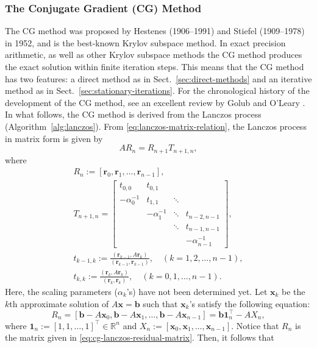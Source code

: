 \subsubsection{{The Conjugate Gradient (CG) Method}}\label{subsec:conjugate-gradient}
{The CG method  was proposed by Hestenes (1906--1991) and Stiefel (1909--1978) in 1952, and is the best-known Krylov subspace method. In exact precision arithmetic, as well as other Krylov subspace methods the CG method produces the exact solution within finite iteration steps. This means that the CG method has two features: a direct method as in Sect.\ \ref{sec:direct-methods} and an iterative method as in Sect.\ \ref{sec:stationary-iterations}. For the chronological history of the development of the CG method, see an excellent review by Golub and O’Leary .}
{In what follows, the CG method is derived from the Lanczos process (Algorithm\ \ref{alg:lanczos}). From \eqref{eq:lanczos-matrix-relation}, the Lanczos process in matrix form is given by}
\begin{equation}\label{eq:cg-lanczos-residual-matrix}AR_n=R_{n+1}T_{n+1,n},\end{equation}
{where}
\[\begin{gathered}
R_n:=[\bm r_0,\bm r_1,\ldots,\bm r_{n-1}],\\
T_{n+1,n}=\begin{bmatrix}t_{0,0}&t_{0,1}&&\\-\alpha_0^{-1}&t_{1,1}&\ddots&\\&-\alpha_1^{-1}&\ddots&t_{n-2,n-1}\\&&\ddots&t_{n-1,n-1}\\&&&-\alpha_{n-1}^{-1}\end{bmatrix},\\
t_{k-1,k}:=\frac{(\bm r_{k-1},A\bm r_k)}{(\bm r_{k-1},\bm r_{k-1})},\quad(k=1,2,\ldots,n-1),\\
t_{k,k}:=\frac{(\bm r_k,A\bm r_k)}{(\bm r_k,\bm r_k)},\quad(k=0,1,\ldots,n-1).
\end{gathered}\]
{Here, the scaling parameters ($\alpha_k$'s) have not been determined yet. Let $\bm x_k$ be the $k$th approximate solution of $A\bm x=\bm b$ such that $\bm x_k$'s satisfy the following equation:}
\[R_n=[\bm b-A\bm x_0,\bm b-A\bm x_1,\ldots,\bm b-A\bm x_{n-1}]=\bm b\bm1_n^{\top}-AX_n,\]
{where $\bm1_n:=[1,1,\ldots,1]^{\top}\in\mathbb R^n$ and $X_n:=[\bm x_0,\bm x_1,\ldots,\bm x_{n-1}]$. Notice that $R_n$ is the matrix given in \eqref{eq:cg-lanczos-residual-matrix}. Then, it follows that}
